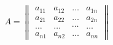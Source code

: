 \documentclass[10pt]{article}
\begin{document}
\[

A=\left\|\begin{array}{cccc}

a_{11} & a_{12} & \ldots & a_{1 n} \\

a_{21} & a_{22} & \ldots & a_{2 n} \\

\ldots & \ldots & \cdots & \ldots \\

a_{n 1} & a_{n 2} & \ldots & a_{n n}

\end{array}\right\|

\]
\end{document}
